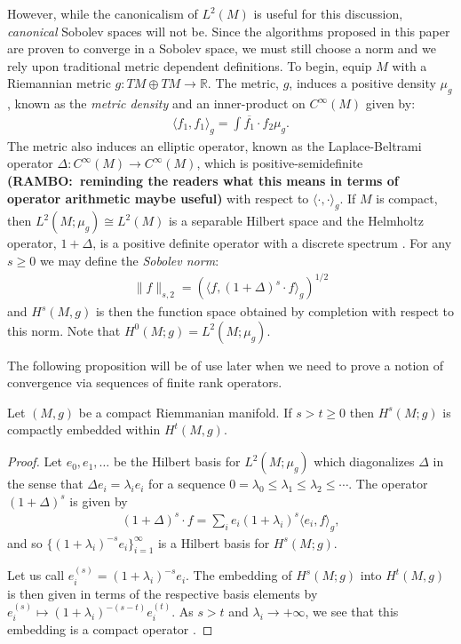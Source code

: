 \documentclass[final,leqno]{siamltex1213}
\newcommand{\ram}[1]{{\normalsize{\textbf{({\color{red}RAMBO:\ }#1)}}}}
\begin{document}
However, while the canonicalism of $L^{2}(M)$ is useful for this discussion, \emph{canonical} Sobolev spaces will not be.
Since the algorithms proposed in this paper are proven to converge in a Sobolev space, we must still choose a norm and we rely upon traditional metric dependent definitions.  
To begin, equip $M$ with a Riemannian metric $g:TM \oplus TM \to \mathbb{R}$.
The metric, $g$, induces a positive density $\mu_g$, known as the \emph{metric density} and an inner-product on $C^\infty(M)$
given by:
\begin{align}
	\langle f_1 , f_1 \rangle_{g} = \int \overline{f_1} \cdot f_2 \mu_g.
\end{align}
The metric also induces an elliptic operator, known as the Laplace-Beltrami operator $\Delta: C^{\infty}(M) \to C^{\infty}(M)$, which is positive-semidefinite \ram{reminding the readers what this means in terms of operator arithmetic maybe useful}
with respect to $\langle \cdot , \cdot \rangle_{g}$.
If $M$ is compact, then $L^2(M ; \mu_g) \cong L^2(M)$ is a separable Hilbert space and the Helmholtz operator, $1 + \Delta$, is a positive definite operator
with a discrete spectrum \cite{Taylor1974}.
For any $s \geq 0$ we may define the \emph{Sobolev norm}:
\begin{align}
	\| f \|_{s,2} =  \left( \langle f , (1+\Delta)^s \cdot f \rangle_{g} \right)^{1/2}
\end{align}
and $H^s(M ,g)$ is then the function space obtained by completion with respect to this norm.
Note that $H^0(M;g) = L^2(M;\mu_g)$.

The following proposition will be of use later when we need to prove a notion of convergence via sequences of finite rank operators.
\begin{proposition} \label{prop:compact_embedding}
	Let $(M,g)$ be a compact Riemmanian manifold.  If $s > t \geq 0$ then $H^s(M;g)$ is compactly embedded within $H^t(M,g)$.
\end{proposition}
\begin{proof}
	Let $e_0, e_1,\dots$ be the Hilbert basis for $L^2(M;\mu_g)$ which diagonalizes $\Delta$
	in the sense that $\Delta e_i = \lambda_i e_i$ for a sequence $0 = \lambda_0 \leq \lambda_1 \leq \lambda_2 \leq \cdots$.
	The operator $(1+\Delta)^s$ is given by
	\begin{align}
		(1+\Delta)^s \cdot f =  \sum_{i} e_i (1+\lambda_i)^s \langle e_i , f \rangle_g,
	\end{align}
	and so $\{ (1+ \lambda_i)^{-s} e_i \}_{i=1}^{\infty}$ is a Hilbert basis for $H^s(M;g)$.
	
	Let us call $e_i^{(s)} = (1+ \lambda_i)^{-s} e_i$.
	The embedding of $H^s(M;g)$ into $H^t(M,g)$
	is then given in terms of the respective basis elements by $e_i^{(s)} \mapsto (1+\lambda_i)^{-(s-t)}e_i^{(t)}$.
	As $s > t$ and $\lambda_i \to +\infty$, we see that 
	this embedding is a compact operator \cite[see Proposition 4.6]{Conway1990}.
\end{proof}
\end{document}

